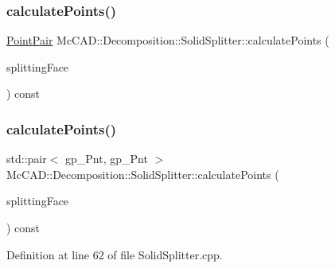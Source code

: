 \subsubsection{\texorpdfstring{calculate\+Points()}{calculatePoints()}\hspace{0.1cm}{\footnotesize\ttfamily [1/2]}}
{\footnotesize\ttfamily \hyperlink{classMcCAD_1_1Decomposition_1_1SolidSplitter_af1bd2cdc22fc3e59277ea6fd04afc42b}{Point\+Pair} Mc\+C\+A\+D\+::\+Decomposition\+::\+Solid\+Splitter\+::calculate\+Points (\begin{DoxyParamCaption}\item[{const Topo\+D\+S\+\_\+\+Face \&}]{splitting\+Face }\end{DoxyParamCaption}) const\hspace{0.3cm}{\ttfamily [private]}}

\mbox{\label{classMcCAD_1_1Decomposition_1_1SolidSplitter_ab9be5e10e5544c26055144c72de0e499}} 
\subsubsection{\texorpdfstring{calculate\+Points()}{calculatePoints()}\hspace{0.1cm}{\footnotesize\ttfamily [2/2]}}
{\footnotesize\ttfamily std\+::pair$<$ gp\+\_\+\+Pnt, gp\+\_\+\+Pnt $>$ Mc\+C\+A\+D\+::\+Decomposition\+::\+Solid\+Splitter\+::calculate\+Points (\begin{DoxyParamCaption}\item[{const Topo\+D\+S\+\_\+\+Face \&}]{splitting\+Face }\end{DoxyParamCaption}) const\hspace{0.3cm}{\ttfamily [private]}}



Definition at line 62 of file Solid\+Splitter.\+cpp.



